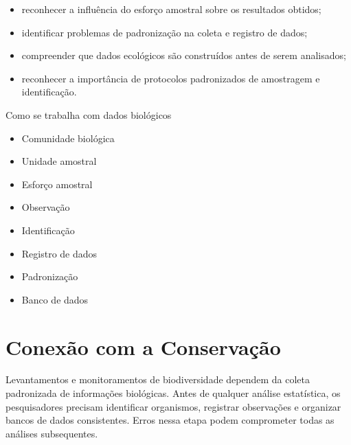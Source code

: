 \documentclass[
  letterpaper,
  DIV=11,
  numbers=noendperiod]{scrartcl}
\begin{document}
\begin{itemize}
\item
  reconhecer a influência do esforço amostral sobre os resultados
  obtidos;
\item
  identificar problemas de padronização na coleta e registro de dados;
\item
  compreender que dados ecológicos são construídos antes de serem
  analisados;
\item
  reconhecer a importância de protocolos padronizados de amostragem e
  identificação.
\end{itemize}

\begin{tcolorbox}[enhanced jigsaw, arc=.35mm, bottomrule=.15mm, bottomtitle=1mm, breakable, colback=white, colbacktitle=quarto-callout-note-color!10!white, colframe=quarto-callout-note-color-frame, coltitle=black, left=2mm, leftrule=.75mm, opacityback=0, opacitybacktitle=0.6, rightrule=.15mm, title=\textcolor{quarto-callout-note-color}{\faInfo}\hspace{0.5em}{Ideia central e Conceitos-chave}, titlerule=0mm, toprule=.15mm, toptitle=1mm]

Como se trabalha com dados biológicos

\begin{itemize}
\item
  Comunidade biológica
\item
  Unidade amostral
\item
  Esforço amostral
\item
  Observação
\item
  Identificação
\item
  Registro de dados
\item
  Padronização
\item
  Banco de dados
\end{itemize}

\end{tcolorbox}

\section{Conexão com a
Conservação}\label{conexuxe3o-com-a-conservauxe7uxe3o}

Levantamentos e monitoramentos de biodiversidade dependem da coleta
padronizada de informações biológicas. Antes de qualquer análise
estatística, os pesquisadores precisam identificar organismos, registrar
observações e organizar bancos de dados consistentes. Erros nessa etapa
podem comprometer todas as análises subsequentes.
\end{document}
